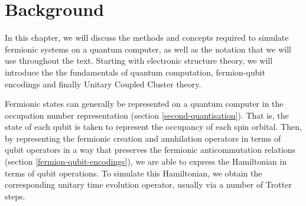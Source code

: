 \chapter{\label{background}Background}
In this chapter, we will discuss the methods and concepts required to simulate fermionic systems on a quantum computer, as well as the notation that we will use throughout the text. Starting with electronic structure theory, we will introduce the the fundamentals of quantum computation, fermion-qubit encodings and finally Unitary Coupled Cluster theory.

Fermionic states can generally be represented on a quantum computer in the occupation number representation (section \ref{second-quantisation}). That is, the state of each qubit is taken to represent the occupancy of each spin orbital. Then, by representing the fermionic creation and annhilation operators in terms of qubit operators in a way that preserves the fermionic anticommutation relations (section \ref{fermion-qubit-encodings}), we are able to express the Hamiltonian in terms of qubit operations. To simulate this Hamiltonian, we obtain the corresponding unitary time evolution operator, usually via a number of Trotter steps.
